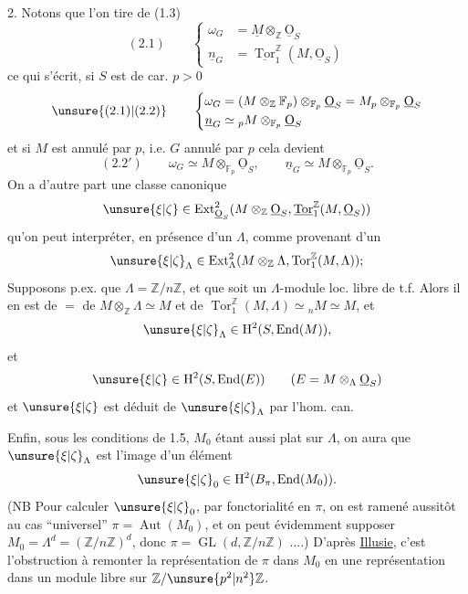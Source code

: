 2. Notons que  l'on tire de (1.3)
\[
(2.1)\qquad\left\{\begin{aligned}
\omega_G&=\underline M\otimes_{\mathbb Z}\underline{\mathrm O}_S\\
\underline n_G&=\underline{\operatorname{Tor}}_1^{\mathbb Z}(M,\underline{\mathrm O}_S)
\end{aligned}\right.
\]
ce qui s'écrit, si $S$ est de car. $p>0$
\[
\unsure{(2.1)|(2.2)}\qquad\left\{\begin{aligned}
\omega_G&=(M\otimes_{\mathbb Z}\mathbb F_p)\otimes_{\mathbb F_p}\underline{\mathrm O}_S=M_p\otimes_{\mathbb F_p}\underline{\mathrm O}_S\\
\underline n_G&\simeq {}_pM\otimes_{\mathbb F_p}\underline{\mathrm O}_S
\end{aligned}\right.
\]
et si $M$ est annulé par $p$, i.e. $G$ annulé par $p$ cela devient
\[
(2.2')\qquad \omega_G\simeq M\otimes_{\mathbb F_p}\underline{\mathrm O}_S,\qquad \underline n_G\simeq M\otimes_{\mathbb F_p}\underline{\mathrm O}_S.
\]
On a d'autre part une classe canonique
\[
\unsure{\xi|\zeta}\in\operatorname{Ext}^{2}_{\underline{\mathrm O}_S}(M\otimes_{\mathbb Z}\underline{\mathrm O}_S,\underline{\operatorname{Tor}}_1^{\mathbb Z}(M,\underline{\mathrm O}_S))
\]
qu'on peut interpréter, en présence d'un $\Lambda$, comme provenant d'un
\[
\unsure{\xi|\zeta}_\Lambda\in\operatorname{Ext}^{2}_{\Lambda}(M\otimes_{\mathbb Z}\Lambda,\operatorname{Tor}_1^{\mathbb Z}(M,\Lambda));
\]
Supposons p.ex. que $\Lambda=\mathbb Z/n\mathbb Z$, et que  soit un $\Lambda$-module loc. libre de t.f. Alors il en est de $=$ de $M\otimes_{\mathbb Z}\Lambda\simeq M$ et de $\operatorname{Tor}_1^{\mathbb Z}(M,\Lambda)\simeq{}_nM\simeq M$, et
\[
\unsure{\xi|\zeta}_\Lambda\in\mathrm H^2(S,\operatorname{End}(M)),
\]
et 
\[
\unsure{\xi|\zeta}\in\mathrm H^2(S,\operatorname{End}(E))\qquad(E=M\otimes_\Lambda\underline{\mathrm O}_S)
\]
et $\unsure{\xi|\zeta}$ est déduit de $\unsure{\xi|\zeta}_\Lambda$ par l'hom. can.

Enfin, sous les conditions de 1.5, $M_0$ étant aussi plat sur $\Lambda$, on aura que $\unsure{\xi|\zeta}_\Lambda$ est l'image d'un élément
\[
\unsure{\xi|\zeta}_0\in\mathrm H^2(B_\pi,\operatorname{End}(M_0)).
\]
(NB Pour calculer $\unsure{\xi|\zeta}_0$, par fonctorialité en $\pi$, on est ramené aussitôt au cas ``universel'' $\pi=\operatorname{Aut}(M_0)$, et on peut évidemment supposer $M_0=\Lambda^d=(\mathbb Z/n\mathbb Z)^d$, donc $\pi=\operatorname{GL}(d,\mathbb Z/n\mathbb Z)$ ....) D'après \uline{Illusie}, c'est l'obstruction à remonter la représentation de $\pi$ dans $M_0$ en une représentation dans un module libre sur $\mathbb Z/\unsure{p^2|n^2}\mathbb Z$.

